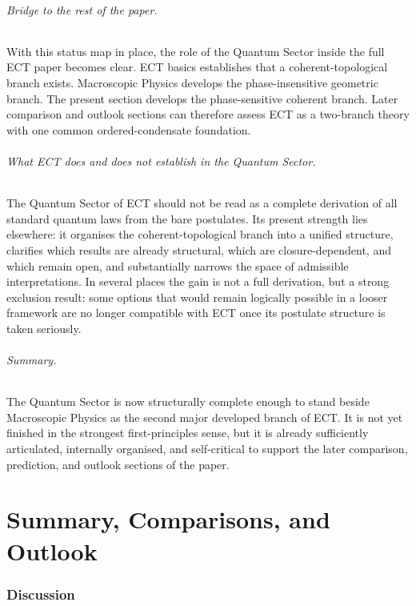 \documentclass[11pt,a4paper]{article}
\numberwithin{equation}{section}
\begin{document}
\paragraph{Bridge to the rest of the paper.}
With this status map in place, the role of the Quantum Sector inside
the full ECT paper becomes clear.
ECT basics establishes that a coherent-topological branch exists.
Macroscopic Physics develops the phase-insensitive geometric branch.
The present section develops the phase-sensitive coherent branch.
Later comparison and outlook sections can therefore assess ECT as a
two-branch theory with one common ordered-condensate foundation.

\paragraph{What ECT does and does not establish in the Quantum Sector.}
The Quantum Sector of ECT should not be read as a complete derivation
of all standard quantum laws from the bare postulates.
Its present strength lies elsewhere: it organises the
coherent-topological branch into a unified structure, clarifies which
results are already structural, which are closure-dependent, and which
remain open, and substantially narrows the space of admissible
interpretations.
In several places the gain is not a full derivation, but a strong
exclusion result: some options that would remain logically possible
in a looser framework are no longer compatible with ECT once its
postulate structure is taken seriously.

\paragraph{Summary.}
The Quantum Sector is now structurally complete enough to stand beside
Macroscopic Physics as the second major developed branch of ECT.
It is not yet finished in the strongest first-principles sense, but it
is already sufficiently articulated, internally organised, and
self-critical to support the later comparison, prediction, and outlook
sections of the paper.

\part{Summary, Comparisons, and Outlook}
\label{part:summary}

\section{Discussion}
\label{sec:discussion}
\end{document}
